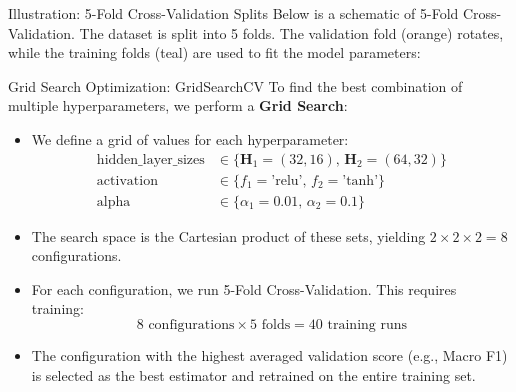 \documentclass[9pt]{beamer}
\begin{document}
\begin{frame}{Illustration: 5-Fold Cross-Validation Splits}
  Below is a schematic of 5-Fold Cross-Validation. The dataset is split into 5 folds. The validation fold (orange) rotates, while the training folds (teal) are used to fit the model parameters:
  \vfill
  \centering
  \vfill
\end{frame}

\begin{frame}{Grid Search Optimization: GridSearchCV}
  To find the best combination of multiple hyperparameters, we perform a \textbf{Grid Search}:
  \begin{itemize}
    \item We define a grid of values for each hyperparameter:
      \begin{align*}
        \text{hidden\_layer\_sizes} &\in \{\mathbf{H}_1 = (32, 16), \, \mathbf{H}_2 = (64, 32)\} \\
        \text{activation} &\in \{f_1 = \text{'relu'}, \, f_2 = \text{'tanh'}\} \\
        \text{alpha} &\in \{\alpha_1 = 0.01, \, \alpha_2 = 0.1\}
      \end{align*}
    \item The search space is the Cartesian product of these sets, yielding $2 \times 2 \times 2 = 8$ configurations.
    \item For each configuration, we run 5-Fold Cross-Validation. This requires training:
      $$8 \text{ configurations} \times 5 \text{ folds} = 40 \text{ training runs}$$
    \item The configuration with the highest averaged validation score (e.g., Macro F1) is selected as the best estimator and retrained on the entire training set.
  \end{itemize}
\end{frame}
\end{document}
